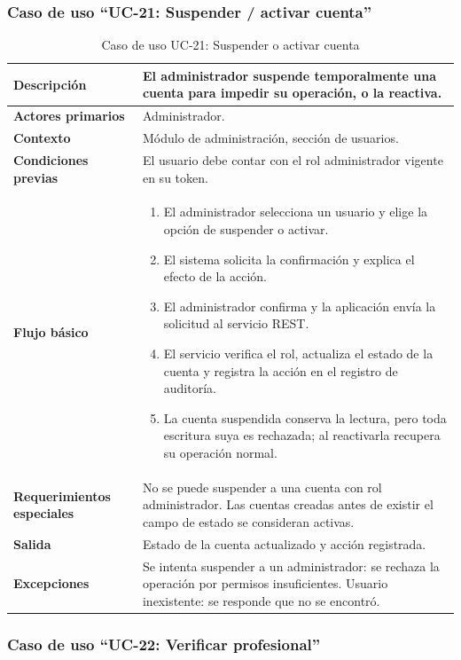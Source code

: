 \documentclass[doc,12pt,a4paper]{apa7}
\begin{document}
\subsubsection{Caso de uso ``UC-21: Suspender / activar cuenta''}

\begin{longtable}{|P{3.3cm}|L{11.2cm}|}
\caption{Caso de uso UC-21: Suspender o activar cuenta}\\
\hline
\textbf{Descripción} & El administrador suspende temporalmente una cuenta para impedir su operación, o la reactiva. \\ \hline
\textbf{Actores primarios} & Administrador. \\ \hline
\textbf{Contexto} & Módulo de administración, sección de usuarios. \\ \hline
\textbf{Condiciones previas} & El usuario debe contar con el rol administrador vigente en su token. \\ \hline
\textbf{Flujo básico} &
\begin{enumerate}
    \item El administrador selecciona un usuario y elige la opción de suspender o activar.
    \item El sistema solicita la confirmación y explica el efecto de la acción.
    \item El administrador confirma y la aplicación envía la solicitud al servicio REST.
    \item El servicio verifica el rol, actualiza el estado de la cuenta y registra la acción en el registro de auditoría.
    \item La cuenta suspendida conserva la lectura, pero toda escritura suya es rechazada; al reactivarla recupera su operación normal.
\end{enumerate} \\ \hline
\textbf{Requerimientos especiales} & No se puede suspender a una cuenta con rol administrador. Las cuentas creadas antes de existir el campo de estado se consideran activas. \\ \hline
\textbf{Salida} & Estado de la cuenta actualizado y acción registrada. \\ \hline
\textbf{Excepciones} & Se intenta suspender a un administrador: se rechaza la operación por permisos insuficientes. Usuario inexistente: se responde que no se encontró. \\ \hline
\end{longtable}

\subsubsection{Caso de uso ``UC-22: Verificar profesional''}
\end{document}
